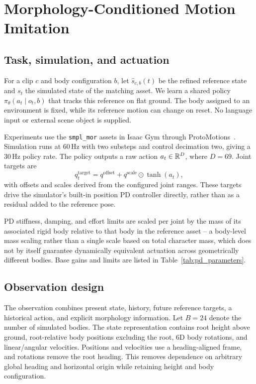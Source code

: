 \section{Morphology-Conditioned Motion Imitation}\label{sec:method}

\subsection{Task, simulation, and actuation}

For a clip $c$ and body configuration $b$, let
$\hat{s}_{c,b}(t)$ be the refined reference state and $s_t$ the simulated state
of the matching asset. We learn a shared policy
$\pi_\theta(a_t\mid o_t,b)$ that tracks this reference on flat ground.
The body assigned to an environment is fixed, while its reference motion can
change on reset. No language input or external scene object is supplied.

Experiments use the \texttt{smpl\_mor} assets in Isaac Gym through
ProtoMotions~\cite{isaacgym,protomotions}. Simulation runs at 60\,Hz with two
substeps and control decimation two, giving a 30\,Hz policy rate. The policy
outputs a raw action $a_t\in\mathbb{R}^D$, where $D=69$. Joint targets are
\begin{equation}
    q_t^{\mathrm{target}}
      = q^{\mathrm{offset}}
        + q^{\mathrm{scale}}\odot\tanh(a_t),
    \label{eq:action_mapping}
\end{equation}
with offsets and scales derived from the configured joint ranges. These
targets drive the simulator's built-in position PD controller directly,
rather than as a residual added to the reference pose.

PD stiffness, damping, and effort limits are scaled per joint by the mass of
its associated rigid body relative to that body in the reference asset --
a body-level mass scaling rather than a single scale based on total character
mass, which does not by itself guarantee dynamically equivalent actuation
across geometrically different bodies. Base gains and limits are listed in
Table~\ref{tab:pd_parameters}.

\subsection{Observation design}\label{sec:observations}

The observation combines present state, history, future reference targets,
a historical action, and explicit morphology information.
Let $B=24$ denote the number of simulated bodies. The state representation
contains root height above ground, root-relative body positions excluding
the root, 6D body rotations, and linear/angular velocities.
Positions and velocities use a heading-aligned frame, and rotations remove
the root heading. This removes dependence on arbitrary global heading and
horizontal origin while retaining height and body configuration.

